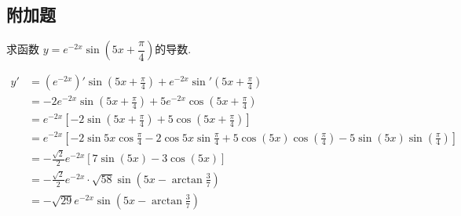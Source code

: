 \begin{questions}
\begin{center}
		\section*{附加题}
	\end{center}
	\question 求函数 $y = e^{-2x}\sin\left(5x+\dfrac{\pi}{4}\right)$的导数.
	\begin{solution}
		\begin{align*}
			y' & =  (e^{-2x})'\sin\left(5x + \frac{\pi}{4}\right) + e^{-2x}\sin'\left(5x +
			\frac{\pi}{4}\right)                                                           \\
			   & = -2e^{-2x}\sin\left(5x+\frac{\pi}{4}\right) +
			5e^{-2x}\cos\left(5x+\frac{\pi}{4}\right)                                      \\
			   & = e^{-2x}\left[-2\sin\left(5x + \frac{\pi}{4}\right) + 5\cos\left(5x +
			\frac{\pi}{4}\right)\right]                                                    \\
			   & = e^{-2x}\left[-2\sin5x\cos\frac{\pi}{4} - 2\cos5x\sin\frac{\pi}{4} +
			5\cos(5x)\cos(\frac{\pi}{4}) - 5\sin(5x)\sin(\frac{\pi}{4})\right]             \\
			   & = -\frac{\sqrt{2}}{2}e^{-2x}[7\sin(5x) - 3\cos(5x)]                       \\
			   & = -\frac{\sqrt{2}}{2}e^{-2x}\cdot \sqrt{58}\sin({5x-\arctan{\frac37}})    \\
			   & = -\sqrt{29}e^{-2x}\sin(5x-\arctan\frac37)
		\end{align*}
	\end{solution}


\end{questions}
